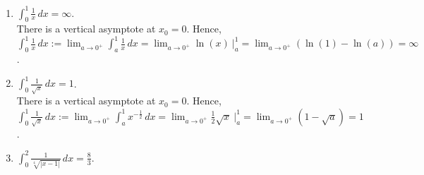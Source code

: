     \begin{enumerate}
\renewcommand{\labelenumi}{(\alph{enumi})}
\setlength{\itemsep}{.2cm}

 \item \Ans \quad $\int_0 ^1 \frac{1}{x} \, dx = \infty$.\\

 There is a vertical asymptote at $x_0=0$. Hence, $\int_0 ^1 \frac{1}{x} \, dx := \displaystyle \lim_{a \to 0^+} \int_a ^1 \frac{1}{x} \, dx = \lim_{a \to 0^+} \ln(x)~\bigg|_a^1 = \lim_{a \to 0^+} \left(\ln(1) -\ln(a) \right)= \infty$.
 
    \item \Ans \quad $\int_0 ^1 \frac{1}{\sqrt{x}} \, dx = 1$.\\

     There is a vertical asymptote at $x_0=0$. Hence, $\int_0 ^1 \frac{1}{\sqrt{x}} \, dx := \displaystyle \lim_{a \to 0^+} \int_a^1 x^{-\frac{1}{2}} \, dx = \lim_{a \to 0^+} \frac{1}{2} \sqrt{x}~\bigg|_a^1 = \lim_{a \to 0^+} \left(1 -\sqrt{a} \right)= 1$.

    \item \Ans \quad $\int_0 ^2 \frac{1}{\sqrt[4]{|x-1|}}\, dx =\frac{8}{3}$.\\


\end{enumerate}
